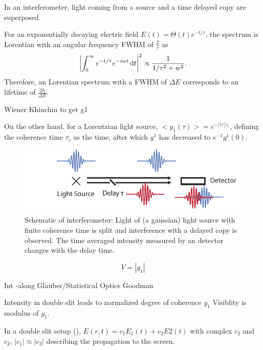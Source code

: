 In an interferometer, light coming from a source and a time delayed copy are superposed.



For an exponentially decaying electric field $E(t)=\Theta(t)e^{-t/\tau}$, the spectrum is Lorentian with an angular frequency FWHM of $\frac{2}{\tau}$ as 
\begin{equation*}
\left|\int_{0}^{\infty}  e^{-t/\tau} e^{-iwt} \dif t \right|^2 \propto  \frac{1}{1/\tau^2+w^2} .
\end{equation*}
Therefore, an Lorentian spectrum with a FWHM of $\Delta E$ corresponds to an lifetime of $\frac{2\hbar}{\Delta E}$.

Wiener Khinchin to get g1

On the other hand, for a Lorentzian light source, $<g_1(\tau)>=e^{-|\tau/| \tau_c}$, defining the coherence time $\tau_c$ as the time, after which $g^1$ has decreased to $e^{-1} g^1(0)$.

 \begin{figure}
	\centering
	\includegraphics[width=0.8\linewidth]{images/michelson.pdf}
	\caption[Schematic of interferometer]{Schematic of interferometer: Light of (a gaussian) light source with finite coherence time is split and interference with a delayed copy is observed. The time averaged intensity measured by an detector changes with the delay time. }
	\label{fig:michelson}
\end{figure}

\begin{equation}
V=\left|g_1\right|
\end{equation}

Int
-along Glauber/Statistical Optics Goodman



Intensity in double slit leads to normalized degree of coherence $g_1$
Visiblity is modulus of $g_1$.

In a double slit setup (), $E(r,t)=c_1 E_1(t)+c_2E2(t)$ with complex $c_2$ and $c_2$, $\left|c_1\right|\approx\left|c_2\right|$ describing the propagation to the screen. 

